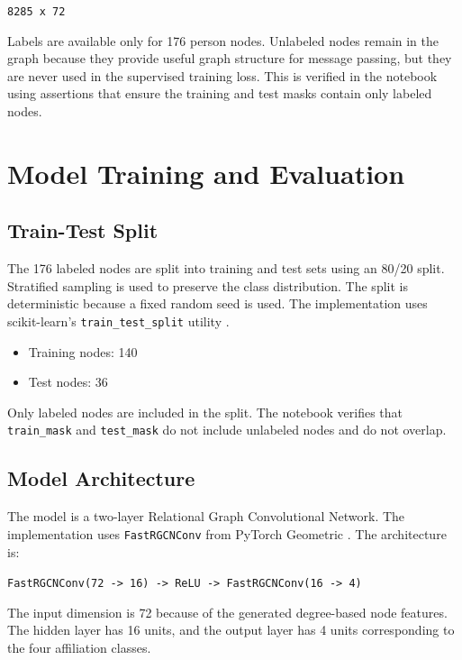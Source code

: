\documentclass[runningheads]{llncs}
\begin{document}
\begin{center}
\texttt{8285 x 72}
\end{center}

Labels are available only for 176 person nodes. Unlabeled nodes remain in the graph because they provide useful graph structure for message passing, but they are never used in the supervised training loss. This is verified in the notebook using assertions that ensure the training and test masks contain only labeled nodes.

\section{Model Training and Evaluation}

\subsection{Train-Test Split}

The 176 labeled nodes are split into training and test sets using an 80/20 split. Stratified sampling is used to preserve the class distribution. The split is deterministic because a fixed random seed is used. The implementation uses scikit-learn's \texttt{train\_test\_split} utility \cite{sklearn}.

\begin{itemize}
    \item Training nodes: 140
    \item Test nodes: 36
\end{itemize}

Only labeled nodes are included in the split. The notebook verifies that \texttt{train\_mask} and \texttt{test\_mask} do not include unlabeled nodes and do not overlap.

\subsection{Model Architecture}

The model is a two-layer Relational Graph Convolutional Network. The implementation uses \texttt{FastRGCNConv} from PyTorch Geometric \cite{rgcn,pygdocs}. The architecture is:

\begin{center}
\texttt{FastRGCNConv(72 -> 16) -> ReLU -> FastRGCNConv(16 -> 4)}
\end{center}

The input dimension is 72 because of the generated degree-based node features. The hidden layer has 16 units, and the output layer has 4 units corresponding to the four affiliation classes.
\end{document}
